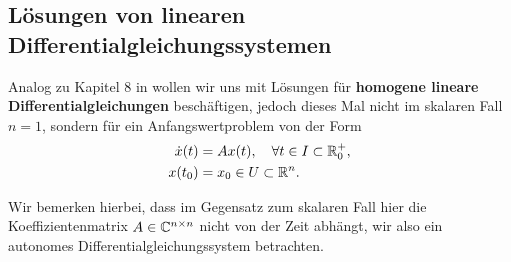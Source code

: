 \subsection{Lösungen von linearen Differentialgleichungssystemen}
\label{\detokenize{ode/repetition:losungen-von-linearen-differentialgleichungssystemen}}\label{\detokenize{ode/repetition:s-lineare-dglsysteme}}
\par
Analog zu Kapitel 8 in \cite{Ten21} wollen wir uns mit Lösungen für \textbf{homogene lineare Differentialgleichungen} beschäftigen, jedoch dieses Mal nicht im skalaren Fall \(n=1\), sondern für ein Anfangswertproblem von der Form
\begin{align}\label{equation:ode/repetition:eq:lin_hom_dglsystem}
\dot{x}(t) &= A x(t), \quad \forall t \in I \subset \mathbb{R}^+_0, \\
x(t_0) &= x_0 \in U \subset \mathbb{R}^n.
\end{align}
\par
Wir bemerken hierbei, dass im Gegensatz zum skalaren Fall hier die Koeffizientenmatrix \(A \in \mathbb{C}^{n\times n}\) nicht von der Zeit abhängt, wir also ein autonomes Differentialgleichungssystem betrachten.

